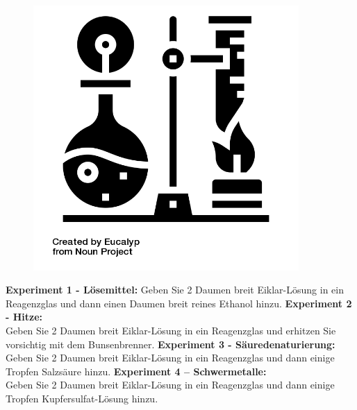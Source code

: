 \documentclass{scrartcl}  %
\begin{document}
			\begin{tcolorbox}[enhanced,
				colback=white,
				colframe=green!30!black,
				fonttitle=\sffamily\bfseries\large, 
				title=Durchführung,  %
				attach boxed title to top left={xshift=3.2mm,yshift=-0.50mm},
				boxed title style={skin=enhancedfirst jigsaw,size=small,arc=1mm,bottom=-1mm,colframe=green!50!black,height=0.75cm},
				colbacktitle=green!50!black,
				drop lifted shadow]
				\begin{figure}  
					\centering
					\vspace{-14pt}  %
					\includegraphics[width=0.9\textwidth]{symbols/symbol_tex_method}
				\end{figure}
				
				\textbf{Experiment 1 - Lösemittel:} \newline 
				Geben Sie 2 Daumen breit Eiklar-Lösung in ein Reagenzglas und dann einen Daumen breit reines Ethanol hinzu. \newline
				\textbf{Experiment 2 - Hitze:} \\
				Geben Sie 2 Daumen breit Eiklar-Lösung in ein Reagenzglas und erhitzen Sie vorsichtig mit dem Bunsenbrenner. \newline
				\textbf{Experiment 3 - Säuredenaturierung:} \\
				Geben Sie 2 Daumen breit Eiklar-Lösung in ein Reagenzglas und dann einige Tropfen Salzsäure hinzu. \newline
				\textbf{Experiment 4 – Schwermetalle:} \\
				Geben Sie 2 Daumen breit Eiklar-Lösung in ein Reagenzglas und dann einige Tropfen Kupfersulfat-Lösung hinzu.
			\end{tcolorbox}
			
\end{document}
